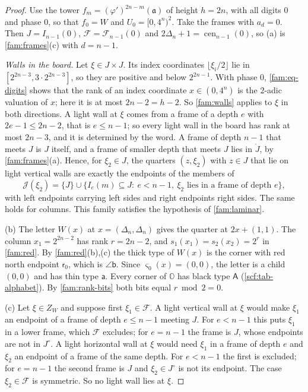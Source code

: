 \begin{proof}
Use the tower $f_m=(\varphi')^{2n-m}(\mathfrak a)$ of height $h=2n$, with all digits $0$ and phase $0$, so that $f_0=W$ and $U_0=[0,4^n)^2$. Take the frames with $a_d=0$. Then $J=I_{n-1}(0)$, $\mathcal F=\mathcal F_{n-1}(0)$ and $2\Delta_n+1=\operatorname{cen}_{n-1}(0)$, so (a) is \cref{fam:frames}(c) with $d=n-1$.

\emph{Walls in the board.} Let $\xi\in J\times J$. Its index coordinates $\lfloor\xi_i/2\rfloor$ lie in $[2^{2n-3},3\cdot2^{2n-3}]$, so they are positive and below $2^{2n-1}$. With phase $0$, \eqref{fam:eq-digits} shows that the rank of an index coordinate $x\in(0,4^n)$ is the $2$-adic valuation of $x$; here it is at most $2n-2=h-2$. So \cref{fam:walls} applies to $\xi$ in both directions. A light wall at $\xi$ comes from a frame of a depth $e$ with $2e-1\le2n-2$, that is $e\le n-1$; so every light wall in the board has rank at most $2n-3$, and it is determined by the word. A frame of depth $n-1$ that meets $J$ is $J$ itself, and a frame of smaller depth that meets $J$ lies in $\mathring J$, by \cref{fam:frames}(a). Hence, for $\xi_2\in J$, the quarters $(z,\xi_2)$ with $z\in J$ that lie on light vertical walls are exactly the endpoints of the members of
\[
\mathcal J(\xi_2)=\{J\}\cup\bigl\{I_e(m)\subseteq J:\ e<n-1,\ \xi_2\text{ lies in a frame of depth }e\bigr\},
\]
with left endpoints carrying left sides and right endpoints right sides. The same holds for columns. This family satisfies the hypothesis of \cref{fam:laminar}.

(b) The letter $W(x)$ at $x=(\Delta_n,\Delta_n)$ gives the quarter at $2x+(1,1)$. The column $x_1=2^{2n-2}$ has rank $r=2n-2$, and $s_1(x_1)=s_2(x_2)=2^r$ in \cref{fam:red}. By \cref{fam:red}(b),(c) the thick type of $W(x)$ is the corner with red north endpoint $\mathsf r_0$, which is $\angle\mathsf b$. Since $\varsigma_0(x)=(0,0)$, the letter is a child $(0,0)$ and has thin type $\mathsf a$. Every corner of $\mathbb O$ has black type $\mathsf A$ (\cref{scf:tab-alphabet}). By \cref{fam:rank-bits} both bits equal $r\bmod2=0$.

(c) Let $\xi\in Z_W$ and suppose first $\xi_1\in\mathcal F$. A light vertical wall at $\xi$ would make $\xi_1$ an endpoint of a frame of depth $e\le n-1$ meeting $J$. For $e<n-1$ this puts $\xi_1$ in a lower frame, which $\mathcal F$ excludes; for $e=n-1$ the frame is $J$, whose endpoints are not in $J^\circ$. A light horizontal wall at $\xi$ would need $\xi_1$ in a frame of depth $e$ and $\xi_2$ an endpoint of a frame of the same depth. For $e<n-1$ the first is excluded; for $e=n-1$ the second frame is $J$ and $\xi_2\in J^\circ$ is not its endpoint. The case $\xi_2\in\mathcal F$ is symmetric. So no light wall lies at $\xi$.


\end{proof}
